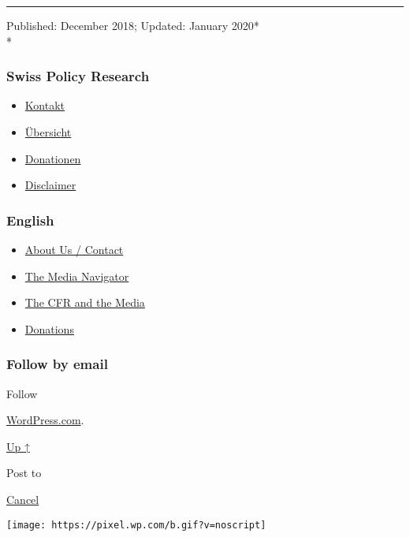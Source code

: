 \begin{center}\rule{0.5\linewidth}{\linethickness}\end{center}

Published: December 2018; Updated: January 2020*\\
*

\hypertarget{swiss-policy-research}{%
\subsubsection{Swiss Policy Research}\label{swiss-policy-research}}

\begin{itemize}
\tightlist
\item
  \href{https://swprs.org/kontakt/}{Kontakt}
\item
  \href{https://swprs.org/uebersicht/}{Übersicht}
\item
  \href{https://swprs.org/donationen/}{Donationen}
\item
  \href{https://swprs.org/disclaimer/}{Disclaimer}
\end{itemize}

\hypertarget{english}{%
\subsubsection{English}\label{english}}

\begin{itemize}
\tightlist
\item
  \href{https://swprs.org/contact/}{About Us / Contact}
\item
  \href{https://swprs.org/media-navigator/}{The Media Navigator}
\item
  \href{https://swprs.org/the-american-empire-and-its-media/}{The CFR
  and the Media}
\item
  \href{https://swprs.org/donations/}{Donations}
\end{itemize}

\hypertarget{follow-by-email}{%
\subsubsection{Follow by email}\label{follow-by-email}}

Follow

\href{https://wordpress.com/?ref=footer_custom_com}{WordPress.com}.

\protect\hyperlink{}{Up ↑}

Post to

\protect\hyperlink{}{Cancel}

\texttt{[image: https://pixel.wp.com/b.gif?v=noscript]}
